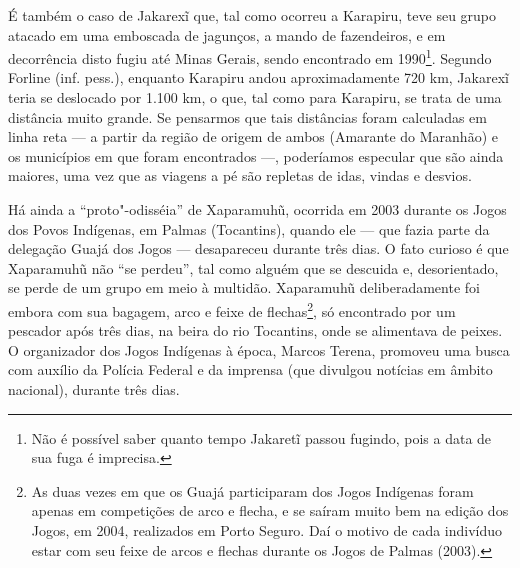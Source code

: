 É também o caso de Jakarexĩ que, tal como ocorreu a Karapiru, teve seu
grupo atacado em uma emboscada de jagunços, a mando de fazendeiros, e em
decorrência disto fugiu até Minas Gerais, sendo encontrado em
1990\footnote{Não é possível saber quanto tempo Jakaretĩ passou fugindo,
  pois a data de sua fuga é imprecisa.}. Segundo Forline (inf. pess.),
enquanto Karapiru andou aproximadamente 720 km, Jakarexĩ teria se
deslocado por 1.100 km, o que, tal como para Karapiru, se trata de uma
distância muito grande. Se pensarmos que tais distâncias foram
calculadas em linha reta --- a partir da região de origem de ambos
(Amarante do Maranhão) e os municípios em que foram encontrados ---,
poderíamos especular que são ainda maiores, uma vez que as viagens a pé
são repletas de idas, vindas e desvios.

Há ainda a ``proto"-odisséia'' de Xaparamuhũ, ocorrida em 2003 durante os
 Jogos dos Povos Indígenas, em Palmas (Tocantins), quando ele --- que
fazia parte da delegação Guajá dos Jogos --- desapareceu durante três
dias. O fato curioso é que Xaparamuhũ não ``se perdeu'', tal como alguém
que se descuida e, desorientado, se perde de um grupo em meio à
multidão. Xaparamuhũ deliberadamente foi embora com sua bagagem, arco e
feixe de flechas\footnote{As duas vezes em que os Guajá participaram dos
  Jogos Indígenas foram apenas em competições de arco e flecha, e se
  saíram muito bem na  edição dos Jogos, em 2004, realizados em Porto
  Seguro. Daí o motivo de cada indivíduo estar com seu feixe de arcos e
  flechas durante os Jogos de Palmas (2003).}, só encontrado por um
pescador após três dias, na beira do rio Tocantins, onde se alimentava
de peixes. O organizador dos Jogos Indígenas à época, Marcos Terena,
promoveu uma busca com auxílio da Polícia Federal e da imprensa (que
divulgou notícias em âmbito nacional), durante três dias.

